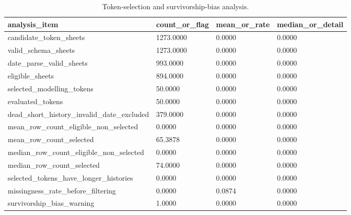 \begin{table}[htbp]
\centering
\begin{tabular}{llll}
\hline
analysis_item & count_or_flag & mean_or_rate & median_or_detail \\
\hline
candidate_token_sheets & 1273.0000 & 0.0000 & 0.0000 \\
valid_schema_sheets & 1273.0000 & 0.0000 & 0.0000 \\
date_parse_valid_sheets & 993.0000 & 0.0000 & 0.0000 \\
eligible_sheets & 894.0000 & 0.0000 & 0.0000 \\
selected_modelling_tokens & 50.0000 & 0.0000 & 0.0000 \\
evaluated_tokens & 50.0000 & 0.0000 & 0.0000 \\
dead_short_history_invalid_date_excluded & 379.0000 & 0.0000 & 0.0000 \\
mean_row_count_eligible_non_selected & 0.0000 & 0.0000 & 0.0000 \\
mean_row_count_selected & 65.3878 & 0.0000 & 0.0000 \\
median_row_count_eligible_non_selected & 0.0000 & 0.0000 & 0.0000 \\
median_row_count_selected & 74.0000 & 0.0000 & 0.0000 \\
selected_tokens_have_longer_histories & 0.0000 & 0.0000 & 0.0000 \\
missingness_rate_before_filtering & 0.0000 & 0.0874 & 0.0000 \\
survivorship_bias_warning & 1.0000 & 0.0000 & 0.0000 \\
\hline
\end{tabular}
\caption{Token-selection and survivorship-bias analysis.}
\label{table_token_selection_bias}
\end{table}